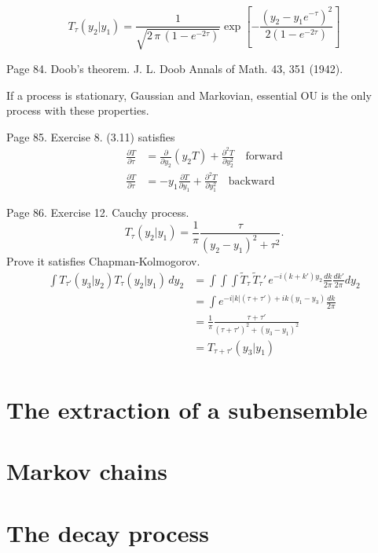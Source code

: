 \documentclass{book}
\theoremstyle{plain}
\theoremstyle{definition}
\theoremstyle{remark}
\begin{document}
\begin{equation}
  T_\tau(y_2 | y_1)
=
\frac{ 1 } { \sqrt{ 2 \, \pi \, (1 - e^{-2\tau}) }  }
\exp\left[
  -\frac{ (y_2 - y_1 e^{-\tau})^2 }
  { 2 ( 1 - e^{-2 \tau } ) }
\right]
\tag{3.11}
\end{equation}

Page 84.
Doob's theorem.
J. L. Doob Annals of Math. 43, 351 (1942).

If a process is stationary, Gaussian and Markovian,
essential OU is the only process with these properties.

Page 85.
Exercise 8. (3.11) satisfies
\begin{align}
\frac{ \partial T } { \partial \tau }
&=
\frac{ \partial } { \partial y_2 } \left( y_2 T \right)
+
\frac{ \partial^2 T } { \partial y_2^2 }
\quad \mathrm{forward}
\tag{3.20}
\\
\frac{ \partial T } { \partial \tau }
&=
-y_1 \frac{ \partial T } { \partial y_1 }
+
\frac{ \partial^2 T } { \partial y_1^2 }
\quad \mathrm{backward}
\tag{3.21}
\end{align}


Page 86.
Exercise 12.
Cauchy process.
\begin{equation}
  T_\tau(y_2|y_1)
  =
  \frac{1}{\pi}
  \frac{ \tau } { (y_2 - y_1)^2 + \tau^2 }.
\end{equation}
Prove it satisfies Chapman-Kolmogorov.
$$
\begin{aligned}
\int T_{\tau'}(y_3|y_2) T_\tau(y_2|y_1) \, dy_2
&=
\int \int \int \tilde T_\tau \, \tilde T_\tau' \,
e^{-i(k + k') y_2 } \frac{dk}{2\pi} \frac{dk'}{2\pi} dy_2
\\
&=
\int e^{ -i|k| (\tau +\tau') + ik (y_1 -y_3) } \frac{dk}{2\pi}
\\
&=
\frac{1}{\pi}
\frac{ \tau + \tau'}
{ (\tau + \tau')^2 + (y_3 - y_1)^2 } \\
&=
T_{\tau + \tau'}(y_3 | y_1) \\
\end{aligned}
$$



\section{The extraction of a subensemble}

\section{Markov chains}

\section{The decay process}
\end{document}

